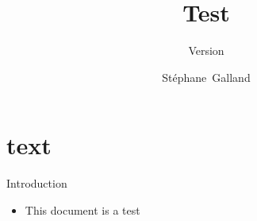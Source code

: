 \documentclass{ciadbeamer}
\title{Test}
\subtitle{Version \insertciadbeamerthemeversion}
\author[S.~Galland]{St\'ephane~Galland}
\begin{document}
\part{text}

\begin{frame}{Introduction}
	\begin{itemize}
	\item This document is a test
	\end{itemize}
\end{frame}
\end{document}
